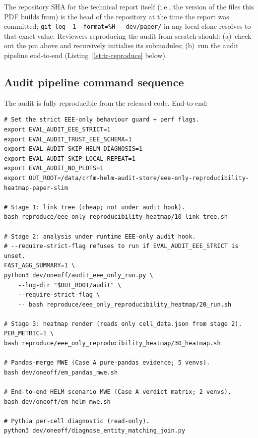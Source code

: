 \documentclass[11pt]{article}
\begin{document}
The repository SHA for the technical report itself
  (i.e., the version of the  files this PDF builds
  from) is the head of the  repository at the time
  the report was committed; \texttt{git log -1 --format=\%H -- dev/paper/}
  in any local clone resolves to that exact value.
Reviewers reproducing the audit from scratch should:
  (a)~check out the  pin above and recursively
  initialise its submodules;
  (b)~run the audit pipeline end-to-end (Listing~\ref{lst:tr-reproduce}
  below).

\subsection{Audit pipeline command sequence}
\label{sec:tr-reproduce-cmds}

The audit is fully reproducible from the released code.
End-to-end:

\begin{lstlisting}[style=shell, caption={Reproducing the slim-paper
  EEE-only HELM audit end-to-end.\label{lst:tr-reproduce}}]
# Set the strict EEE-only behaviour guard + perf flags.
export EVAL_AUDIT_EEE_STRICT=1
export EVAL_AUDIT_TRUST_EEE_SCHEMA=1
export EVAL_AUDIT_SKIP_HELM_DIAGNOSIS=1
export EVAL_AUDIT_SKIP_LOCAL_REPEAT=1
export EVAL_AUDIT_NO_PLOTS=1
export OUT_ROOT=/data/crfm-helm-audit-store/eee-only-reproducibility-heatmap-paper-slim

# Stage 1: link tree (cheap; not under audit hook).
bash reproduce/eee_only_reproducibility_heatmap/10_link_tree.sh

# Stage 2: analysis under runtime EEE-only audit hook.
# --require-strict-flag refuses to run if EVAL_AUDIT_EEE_STRICT is unset.
FAST_AGG_SUMMARY=1 \
python3 dev/oneoff/audit_eee_only_run.py \
    --log-dir "$OUT_ROOT/audit" \
    --require-strict-flag \
    -- bash reproduce/eee_only_reproducibility_heatmap/20_run.sh

# Stage 3: heatmap render (reads only cell_data.json from stage 2).
PER_METRIC=1 \
bash reproduce/eee_only_reproducibility_heatmap/30_heatmap.sh

# Pandas-merge MWE (Case A pure-pandas evidence; 5 venvs).
bash dev/oneoff/em_pandas_mwe.sh

# End-to-end HELM scenario MWE (Case A verdict matrix; 2 venvs).
bash dev/oneoff/em_helm_mwe.sh

# Pythia per-cell diagnostic (read-only).
python3 dev/oneoff/diagnose_entity_matching_join.py
\end{lstlisting}
\end{document}
